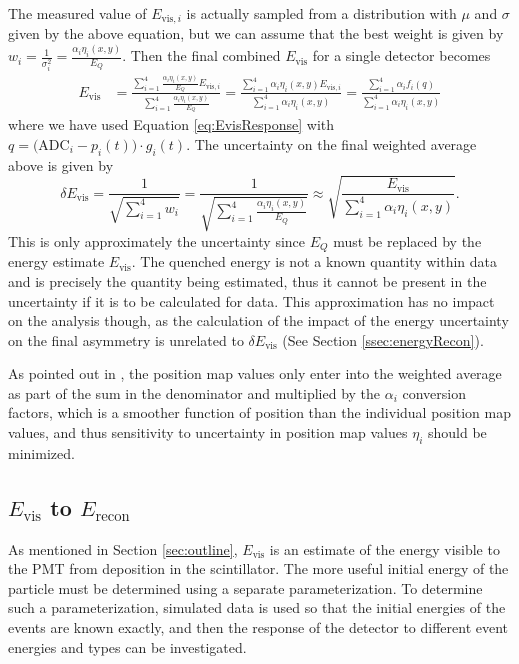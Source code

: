 The measured value of $E_{\mathrm{vis},i}$ is actually sampled from a distribution with $\mu$ and $\sigma$ given by the
above equation, but we can assume that the best weight is given by $w_i = \frac{1}{\sigma_i^2} = \frac{\alpha_i \eta_i(x,y)}{E_Q}$.
Then the final combined $E_{\mathrm{vis}}$ for a single detector becomes
%
\begin{align}
  E_{\mathrm{vis}} &= \frac{\sum_{i=1}^{4} \frac{\alpha_i \eta_i(x,y)}{E_Q} E_{\mathrm{vis},i}}{\sum_{i=1}^{4} \frac{\alpha_i \eta_i(x,y)}{E_Q}}
  = \frac{\sum_{i=1}^{4} \alpha_i \eta_i(x,y) E_{\mathrm{vis},i}}{\sum_{i=1}^{4} \alpha_i \eta_i(x,y)} 
  = \frac{\sum_{i=1}^{4} \alpha_i f_i(q)}{\sum_{i=1}^{4} \alpha_i \eta_i(x,y)}
\end{align}
%
where we have used Equation \ref{eq:EvisResponse} with $q=\big( \mathrm{ADC}_i - p_i(t) \big) \cdot g_i(t)$.
The uncertainty on the final weighted average above is given by
\begin{equation}
  \delta E_{\mathrm{vis}} = \frac{1}{\sqrt{\sum_{i=1}^{4} w_i}} = \frac{1}{\sqrt{\sum_{i=1}^{4} \frac{\alpha_i \eta_i(x,y)}{E_Q}}}
    \approx  \sqrt{\frac{E_{\mathrm{vis}}}{\sum_{i=1}^{4}\alpha_i \eta_i(x,y)}}.
\end{equation}
This is only approximately the uncertainty since $E_Q$ must be replaced by the energy estimate $E_{\mathrm{vis}}$. The quenched
energy is not a known quantity within data and is precisely the quantity being estimated, thus it cannot
be present in the uncertainty if it is to be calculated for data. This approximation has no impact
on the analysis though, as the calculation of the impact of the energy uncertainty on the final asymmetry is unrelated
to $ \delta E_{\mathrm{vis}}$ (See Section \ref{ssec:energyRecon}).

As pointed out in \cite{mpmThesis}, the position map values only enter into the weighted average
as part of the sum in the denominator and multiplied by the $\alpha_i$ conversion factors, which is a smoother
function of position than the individual position map values, and thus sensitivity to uncertainty in position map
values $\eta_i$ should be minimized.

\subsection{$E_{\mathrm{vis}}$ to $E_{\mathrm{recon}}$}

As mentioned in Section \ref{sec:outline}, $E_{\mathrm{vis}}$ is an estimate of the
energy visible to the PMT from deposition in the scintillator. The more useful
initial energy of the particle must be determined using a separate parameterization.
To determine such a parameterization, simulated data is used so that the initial
energies of the events are known exactly, and then the response of the detector
to different event energies and types can be investigated.

